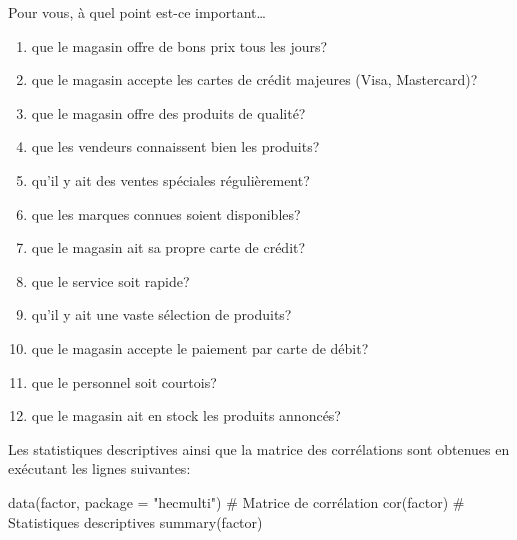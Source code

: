 \documentclass[
  11pt,
  letterpaper,
]{book}
\newenvironment{Shaded}{\begin{snugshade}}{\end{snugshade}}
\newcommand{\AttributeTok}[1]{\textcolor[rgb]{0.40,0.45,0.13}{#1}}
\newcommand{\CommentTok}[1]{\textcolor[rgb]{0.37,0.37,0.37}{#1}}
\newcommand{\FunctionTok}[1]{\textcolor[rgb]{0.28,0.35,0.67}{#1}}
\newcommand{\NormalTok}[1]{\textcolor[rgb]{0.00,0.23,0.31}{#1}}
\newcommand{\StringTok}[1]{\textcolor[rgb]{0.13,0.47,0.30}{#1}}
\providecommand{\tightlist}{%
  \setlength{\itemsep}{0pt}\setlength{\parskip}{0pt}}\usepackage{longtable,booktabs,array}
\theoremstyle{definition}
\theoremstyle{remark}
\begin{document}
Pour vous, à quel point est-ce important\ldots

\begin{enumerate}
\def\labelenumi{\arabic{enumi}.}
\tightlist
\item
  que le magasin offre de bons prix tous les jours?
\item
  que le magasin accepte les cartes de crédit majeures (Visa,
  Mastercard)?
\item
  que le magasin offre des produits de qualité?
\item
  que les vendeurs connaissent bien les produits?
\item
  qu'il y ait des ventes spéciales régulièrement?
\item
  que les marques connues soient disponibles?
\item
  que le magasin ait sa propre carte de crédit?
\item
  que le service soit rapide?
\item
  qu'il y ait une vaste sélection de produits?
\item
  que le magasin accepte le paiement par carte de débit?
\item
  que le personnel soit courtois?
\item
  que le magasin ait en stock les produits annoncés?
\end{enumerate}

Les statistiques descriptives ainsi que la matrice des corrélations sont
obtenues en exécutant les lignes suivantes:

\begin{Shaded}
\begin{Highlighting}[]
\FunctionTok{data}\NormalTok{(factor, }\AttributeTok{package =} \StringTok{"hecmulti"}\NormalTok{)}
\CommentTok{\# Matrice de corrélation}
\FunctionTok{cor}\NormalTok{(factor)}
\CommentTok{\# Statistiques descriptives}
\FunctionTok{summary}\NormalTok{(factor)}
\end{Highlighting}
\end{Shaded}
\end{document}
